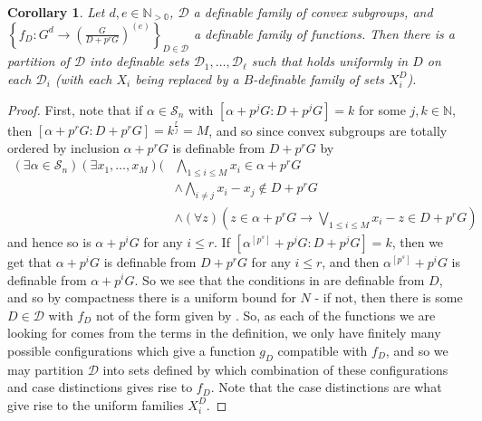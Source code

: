 \documentclass[a4paper,11pt]{article}
\newtheorem{corollary}[theorem]{Corollary}
\newcommand{\nl}{\newline}
\newcommand{\Sn}{\mathcal{S}_n}
\begin{document}
\begin{corollary}\label{uniform main for prG}
    Let $d,e\in\mathbb{N_{>0}}$, $\mathcal{D}$ a definable family of convex subgroups, and $\left\{f_D:G^d\rightarrow(\frac{G}{D+p^rG})^{(e)}\right\}_{D\in\mathcal{D}}$ a definable family of functions. Then there is a partition of $\mathcal{D}$ into definable sets $\mathcal{D}_1,\dots,\mathcal{D}_\ell$ such that  holds uniformly in $D$ on each $\mathcal{D}_i$ (with each $X_i$ being replaced by a $B$-definable family of sets $X_i^D$).
\end{corollary}
\begin{proof}
    First, note that if $\alpha\in\Sn$ with $[\alpha+p^jG:D+p^jG] = k$ for some $j,k\in\mathbb{N}$, then $[\alpha+p^rG:D+p^rG] = k^{\frac{r}{j}}=M$, and so since convex subgroups are totally ordered by inclusion $\alpha+p^rG$ is definable from $D+p^rG$ by
    \begin{align*}
        (\exists\alpha\in\Sn)(\exists x_1,\dots,x_M)(&\bigwedge\limits_{1\leq i\leq M} x_i\in\alpha+p^rG \\
        &\wedge\bigwedge\limits_{i\neq j}x_i-x_j\notin D+p^rG \\
        &\wedge (\forall z)(z\in \alpha+p^rG \rightarrow \bigvee\limits_{1\leq i\leq M}x_i-z\in D+p^rG)
    \end{align*}
    and hence so is $\alpha+p^iG$ for any $i\leq r$. If $[\alpha^{[p^s]}+p^jG:D+p^jG] = k$, then we get that $\alpha+p^iG$ is definable from $D+p^rG$ for any $i\leq r$, and then $\alpha^{[p^s]}+p^iG$ is definable from $\alpha+p^iG$.
    \nl\nl
    So we see that the conditions in  are definable from $D$, and so by compactness there is a uniform bound for $N$ - if not, then there is some $D\in\mathcal{D}$ with $f_D$ not of the form given by . So, as each of the functions we are looking for comes from the terms in the definition, we only have finitely many possible configurations which give a function $g_D$ compatible with $f_D$, and so we may partition $\mathcal{D}$ into sets defined by which combination of these configurations and case distinctions gives rise to $f_D$. Note that the case distinctions are what give rise to the uniform families $X_i^D$.
\end{proof}

\end{document}
